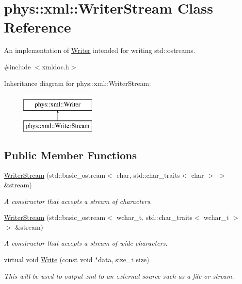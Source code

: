 \hypertarget{classphys_1_1xml_1_1WriterStream}{
\section{phys::xml::WriterStream Class Reference}
\label{d5/d6f/classphys_1_1xml_1_1WriterStream}
}


An implementation of \hyperlink{classphys_1_1xml_1_1Writer}{Writer} intended for writing std::ostreams.  




{\ttfamily \#include $<$xmldoc.h$>$}

Inheritance diagram for phys::xml::WriterStream:\begin{figure}[H]
\begin{center}
\leavevmode
\includegraphics[height=2.000000cm]{d5/d6f/classphys_1_1xml_1_1WriterStream}
\end{center}
\end{figure}
\subsection*{Public Member Functions}
\begin{DoxyCompactItemize}
\item 
\hyperlink{classphys_1_1xml_1_1WriterStream_ae170ab7c429b6f7149d3540243329dfa}{WriterStream} (std::basic\_\-ostream$<$ char, std::char\_\-traits$<$ char $>$ $>$ \&stream)
\begin{DoxyCompactList}\small\item\em A constructor that accepts a stream of characters. \item\end{DoxyCompactList}\item 
\hyperlink{classphys_1_1xml_1_1WriterStream_aaebcd545af8e44cf6556a46077f0a366}{WriterStream} (std::basic\_\-ostream$<$ wchar\_\-t, std::char\_\-traits$<$ wchar\_\-t $>$ $>$ \&stream)
\begin{DoxyCompactList}\small\item\em A constructor that accepts a stream of wide characters. \item\end{DoxyCompactList}\item 
virtual void \hyperlink{classphys_1_1xml_1_1WriterStream_a74242c8abe03f6244d3464a663f75de9}{Write} (const void $\ast$data, size\_\-t size)
\begin{DoxyCompactList}\small\item\em This will be used to output xml to an external source such as a file or stream. \item\end{DoxyCompactList}\end{DoxyCompactItemize}


